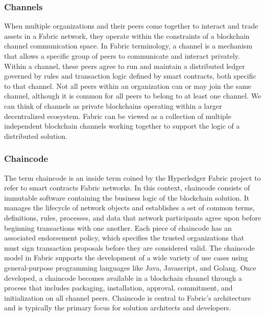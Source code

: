 \documentclass[conference]{IEEEtran}
\begin{document}
\subsubsection{Channels}
When multiple organizations and their peers come together to interact and trade assets in a Fabric network, they operate within the constraints of a blockchain channel communication space. In Fabric terminology, a channel is a mechanism that allows a specific group of peers to communicate and interact privately. Within a channel, these peers agree to run and maintain a distributed ledger governed by rules and transaction logic defined by smart contracts, both specific to that channel. Not all peers within an organization can or may join the same channel, although it is common for all peers to belong to at least one channel. We can think of channels as private blockchains operating within a larger decentralized ecosystem. Fabric can be viewed as a collection of multiple independent blockchain channels working together to support the logic of a distributed solution. \\

\subsubsection{Chaincode}
The term chaincode is an inside term coined by the Hyperledger Fabric project to refer to smart contracts Fabric networks. In this context, chaincode consists of immutable software containing the business logic of the blockchain solution. It manages the lifecycle of network objects and establishes a set of common terms, definitions, rules, processes, and data that network participants agree upon before beginning transactions with one another. Each piece of chaincode has an associated endorsement policy, which specifies the trusted organizations that must sign transaction proposals before they are considered valid. The chaincode model in Fabric supports the development of a wide variety of use cases using general-purpose programming languages like Java, Javascript, and Golang. Once developed, a chaincode becomes available in a blockchain channel through a process that includes packaging, installation, approval, commitment, and initialization on all channel peers. Chaincode is central to Fabric's architecture and is typically the primary focus for solution architects and developers. \\
\end{document}
